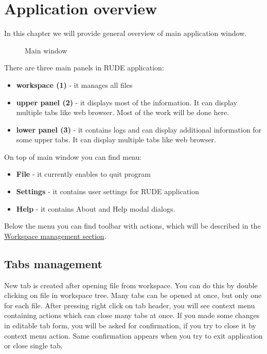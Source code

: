 \section{Application overview}\label{section:overview}

In this chapter we will provide general overview of main application window.

\begin{figure*}[!ht] 
	\centering
	\caption{Main window}
\end{figure*}

There are three main panels in RUDE application:
\begin{itemize}
	\item \textbf{workspace (1)} - it manages all files
	\item \textbf{upper panel (2)} - it displays most of the information. It can display multiple tabs like web browser. Most of the work will be done here.
	\item \textbf{lower panel (3)} - it contains logs and can display additional information for some upper tabs. It can display multiple tabs like web browser.
\end{itemize}

On top of main window you can find menu:
\begin{itemize}
	\item \textbf{File} - it currently enables to quit program
	\item \textbf{Settings} - it contains user settings for RUDE application
	\item \textbf{Help} - it contains About and Help modal dialogs.
\end{itemize}

Below the menu you can find toolbar with actions, which will be described in the \hyperref[section:workspace]{Workspace management section}.


\subsection{Tabs management}\label{sub:overview-tab}
New tab is created after opening file from workspace. You can do this by double clicking on file in workspace tree. Many tabs can be opened at once, but only one for each file. After pressing right click on tab header, you will see context menu containing actions which can close many tabs at once. If you made some changes in editable tab form, you will be asked for confirmation, if you try to close it by context menu action. Same confirmation appears when you try to exit application or close single tab.\\

